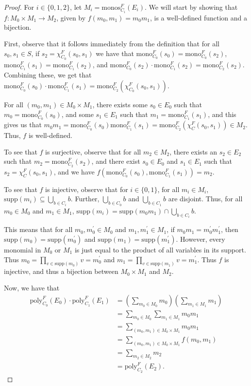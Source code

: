 \documentclass[authordate,onecolumn]{miri-tech-article}
\begin{document}
\begin{proof}
For $i\in \{0,1,2\}$, let $M_i=\text{monos}^F_{C_i}(E_i)$. We will start by showing that $f:M_0\times M_1\rightarrow M_2$, given by $f(m_0,m_1)=m_0m_1$, is a well-defined function and a bijection.

First, observe that it follows immediately from the definition that for all $s_0,s_1\in S$, if $s_2=\chi^F_{C_0}(s_0,s_1)$ we have that $\text{mono}^F_{C_0}(s_0)=\text{mono}^F_{C_0}(s_2)$, $\text{mono}^F_{C_1}(s_1)=\text{mono}^F_{C_1}(s_2)$, and $\text{mono}^F_{C_0}(s_2)\cdot\text{mono}^F_{C_1}(s_2)=\text{mono}^F_{C_2}(s_2)$. Combining these, we get that $\text{mono}^F_{C_0}(s_0)\cdot\text{mono}^F_{C_1}(s_1)=\text{mono}^F_{C_2}(\chi^F_{C_0}(s_0,s_1))$.

For all $(m_0,m_1)\in M_0\times M_1$, there exists some $s_0\in E_0$ such that $m_0=\text{mono}^F_{C_0}(s_0)$, and some $s_1\in E_1$ such that $m_1=\text{mono}^F_{C_1}(s_1)$, and this gives us that $m_0m_1=\text{mono}^F_{C_0}(s_0)\text{mono}^F_{C_1}(s_1)=\text{mono}^F_{C_2}(\chi^F_C(s_0,s_1))\in M_2$. Thus, $f$ is well-defined.

To see that $f$ is surjective, observe that for all $m_2\in M_2$, there exists an $s_2\in E_2$ such that $m_2=\text{mono}^F_{C_2}(s_2)$, and there exist $s_0\in E_0$ and $s_1\in E_1$ such that $s_2=\chi^F_C(s_0,s_1)$, and we have $f(\text{mono}^F_{C_0}(s_0),\text{mono}^F_{C_1}(s_1))=m_2$.

To see that $f$ is injective, observe that for $i\in\{0,1\}$, for all $m_i\in M_i$, $\text{supp}(m_i)\subseteq \bigcup_{b\in C_i} b$. Further, $\bigcup_{b\in C_0} b$ and $\bigcup_{b\in C_1} b$ are disjoint. Thus, for all $m_0\in M_0$ and $m_1\in M_1$, $\text{supp}(m_i)=\text{supp}(m_0m_1)\cap \bigcup_{b\in C_i} b$.

This means that for all $m_0,m_0^\prime\in M_0$ and $m_1,m_1^\prime\in M_1$, if $m_0m_1=m_0^\prime m_1^\prime$, then $\text{supp}(m_0)=\text{supp}(m_0^\prime)$ and $\text{supp}(m_1)=\text{supp}(m_1^\prime)$. However, every monomial in $M_0$ or $M_1$ is just equal to the product of all variables in its support. Thus $m_0=\prod_{v\in \text{supp}(m_0)}v=m_0^\prime$ and $m_1=\prod_{v\in \text{supp}(m_1)}v=m_1^\prime$. Thus $f$ is injective, and thus a bijection between $M_0\times M_1$ and $M_2$.

Now, we have that
\begin{equation}
\begin{split}
\text{poly}^F_{C_0}(E_0)\cdot \text{poly}^F_{C_1}(E_1) & = \left(\sum_{m_0\in M_0}m_0\right)\left(\sum_{m_1\in M_1}m_1\right) \\
 & = \sum_{m_0\in M_0}\sum_{m_1\in M_1}m_0m_1\\
 & = \sum_{(m_0,m_1)\in M_0\times M_1}m_0m_1\\
  & = \sum_{(m_0,m_1)\in M_0\times M_1}f(m_0,m_1)\\
    & = \sum_{m_2\in M_2}m_2\\
      & = \text{poly}^F_{C_2}(E_2).
\end{split}
\end{equation}
\end{proof}
\end{document}
